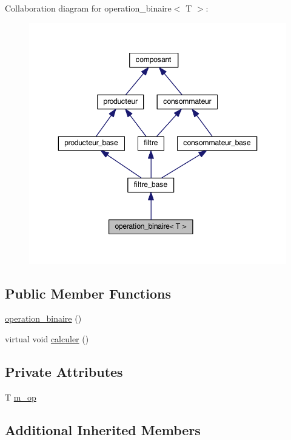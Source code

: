 Collaboration diagram for operation\-\_\-binaire$<$ T $>$\-:
\nopagebreak
\begin{figure}[H]
\begin{center}
\leavevmode
\includegraphics[width=346pt]{classoperation__binaire__coll__graph}
\end{center}
\end{figure}
\subsection*{Public Member Functions}
\begin{DoxyCompactItemize}
\item 
\hyperlink{classoperation__binaire_a968e4ce2a6b76860f95256aedd568216}{operation\-\_\-binaire} ()
\item 
virtual void \hyperlink{classoperation__binaire_a2ecfa3c6c05006c5c1bc285281bc6f3a}{calculer} ()
\end{DoxyCompactItemize}
\subsection*{Private Attributes}
\begin{DoxyCompactItemize}
\item 
T \hyperlink{classoperation__binaire_a7a8ee3b101f3fe8653fd62082e299051}{m\-\_\-op}
\end{DoxyCompactItemize}
\subsection*{Additional Inherited Members}


